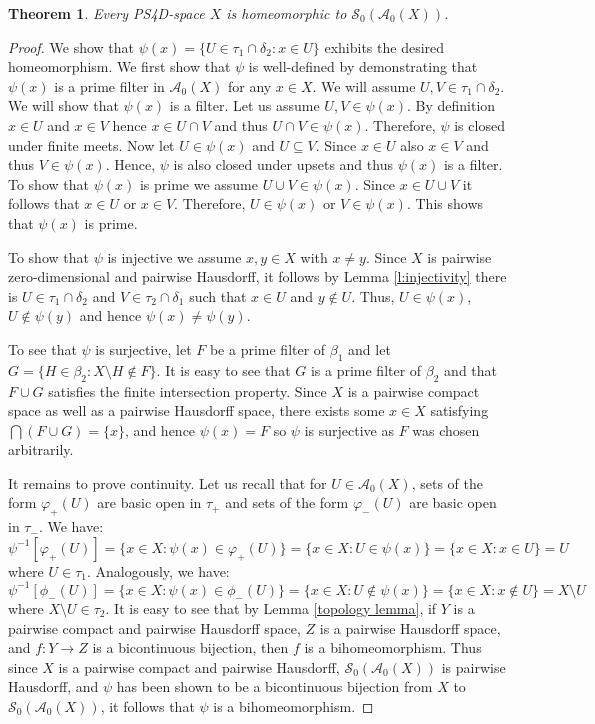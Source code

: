 \documentclass{amsart}
\theoremstyle{plain}
\newtheorem{theorem}{Theorem}[section]
\theoremstyle{definition}
\begin{document}
\begin{theorem}\label{algebraic realization}
    Every PS4D-space $X$ is homeomorphic to $\mathcal{S}_0(\mathcal{A}_0(X))$.
\end{theorem}
\begin{proof}
We show that $\psi(x)=\{U\in\tau_1\cap\delta_2:x\in U\}$ exhibits the desired homeomorphism. We first show that $\psi$ is well-defined by demonstrating that $\psi(x)$ is a prime filter in $\mathcal{A}_0(X)$ for any $x\in X$. We will assume $U,V \in \tau_1 \cap \delta_2$. We will show that $\psi(x)$ is a filter. Let  us assume $U,V \in \psi(x)$. By definition $x \in U$ and $x \in V$ hence $x \in U \cap V$ and thus $U \cap V \in \psi(x)$. Therefore, $\psi$ is closed under finite meets. Now let $U \in \psi(x)$ and $U \subseteq V$. Since $x \in U$ also $x \in V$ and thus $V \in \psi(x)$. Hence, $\psi$ is also closed under upsets and thus $\psi(x)$ is a filter. To show that $\psi(x)$ is prime we assume $U \cup V \in \psi(x)$. Since $x \in U \cup V$ it follows that $x \in U$ or $x \in V$. Therefore, $U \in \psi(x)$ or $V \in \psi(x)$. This shows that $\psi(x)$ is prime.

To show that $\psi$ is injective we assume $x,y \in X$ with $x\not=y$.
    Since $X$ is pairwise zero-dimensional and pairwise Hausdorff, it follows by Lemma \ref{l:injectivity} there is $U \in \tau_1 \cap \delta_2$ and $V \in \tau_2 \cap \delta_1$ such that $x \in U$ and $y \notin U$. Thus, $U \in \psi(x)$, $U  \notin \psi(y)$ and hence $\psi(x) \neq \psi(y)$.

To see that $\psi$ is surjective, let $F$ be a prime filter of $\beta_1$ and let $G=\{H\in\beta_2:X\setminus H\not\in F\}$. It is easy to see that $G$ is a prime filter of $\beta_2$ and that $F\cup G$ satisfies the finite intersection property. Since $X$ is a pairwise compact space as well as a pairwise Hausdorff space, there exists some $x\in X$ satisfying $\bigcap(F\cup G)=\{x\}$, and hence $\psi(x)=F$ so $\psi$ is surjective as $F$ was chosen arbitrarily.  

It remains to prove continuity. Let us recall that for $U\in\mathcal{A}_0(X)$, sets of the form $\varphi_+(U)$ are basic open in $\tau_+$ and sets of the form $\varphi_-(U)$ are basic open in $\tau_-$. We have: 
$$\psi^{-1}[\varphi_+(U)]=\{x \in X : \psi(x) \in \varphi_+(U)\}=\{x \in X : U \in \psi(x)\}=\{x \in X : x \in U\}=U$$
where $U\in\tau_1$. Analogously, we have: 
\[\psi^{-1}[\phi_-(U)]=\{x\in X:\psi(x)\in \phi_-(U)\}=\{x\in X:U\not\in\psi(x)\}=\{x\in X:x\not\in U\}=X\setminus U\] where $X\setminus U\in\tau_2$. It is easy to see that by Lemma \ref{topology lemma}, if $Y$ is a pairwise compact and pairwise Hausdorff space, $Z$ is a pairwise Hausdorff space, and $f\colon Y\to Z$ is a bicontinuous bijection, then $f$ is a bihomeomorphism. Thus since $X$ is a pairwise compact and pairwise Hausdorff, $\mathcal{S}_0(\mathcal{A}_0(X))$ is pairwise Hausdorff, and $\psi$ has been shown to be a bicontinuous bijection from $X$ to $\mathcal{S}_0(\mathcal{A}_0(X))$, it follows that $\psi$ is a bihomeomorphism. 
\end{proof}
\end{document}

